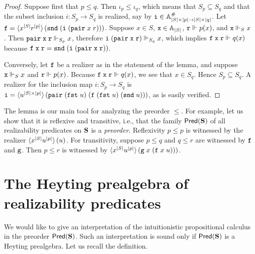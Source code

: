 \begin{proof}
  Suppose first that $p \leq q$. Then $\iota_p \leq \iota_q$, which
  means that $S_p \subseteq S_q$ and that the subset inclusion $i :
  S_p \to S_q$ is realized, say by $\mathtt{i} \in \mathbb{A}^{\#}_{|S| \times |p|
    \to |S| \times |q|}$. Let $\mathtt{f} = \langle x^{|S|}
    r^{|p|} \rangle\,(\mathtt{snd}\;(\mathtt{i}\;(\mathtt{pair}\;x\;r)))$. Suppose $x
  \in S$, $\mathtt{x} \in \mathbb{A}_{|S|}$, $\mathtt{r} \Vdash p(x)$, and $\mathtt{x} \Vdash_S
  x$. Then $\mathtt{pair}\;\mathtt{x}\;\mathtt{r} \Vdash_{S_p} x$, therefore
  $\mathtt{i}\;(\mathtt{pair}\;\mathtt{x}\;\mathtt{r}) \Vdash_{S_q} x$, which implies
  $\mathtt{f}\;\mathtt{x}\;\mathtt{r} \Vdash q(x)$ because $\mathtt{f}\;\mathtt{x}\;\mathtt{r} =
  \mathtt{snd}\;(\mathtt{i}\;(\mathtt{pair}\;\mathtt{x}\;\mathtt{r}))$.

  Conversely, let $\mathtt{f}$ be a realizer as in the statement of the
  lemma, and suppose $\mathtt{x} \Vdash_S x$ and $\mathtt{r} \Vdash p(x)$. Because
  $\mathtt{f}\;\mathtt{x}\;\mathtt{r} \Vdash q(x)$, we see that $x \in S_q$. Hence $S_p
  \subseteq S_q$. A realizer for the inclusion map $i : S_p \to S_q$
  is $\mathtt{i} = \langle u^{|S| \times
      |p|} \rangle\,(\mathtt{pair}\;(\mathtt{fst}\;u)\;(\mathtt{f}\;(\mathtt{fst}\;u)\;(\mathtt{snd}\;u)))$,
  as is easily verified.
\end{proof}

The lemma is our main tool for analyzing the preorder $\leq$. For
example, let us show that it is reflexive and transitive, i.e., that
the family $\mathsf{Pred}(\mathbf{S})$ of all realizability predicates on
$\mathbf{S}$ is a \emph{preorder}. Reflexivity $p \leq p$ is witnessed by
the realizer $\langle x^{|S|} u^{|p|} \rangle\,(u)$. For
transitivity, suppose $p \leq q$ and $q \leq r$ are witnessed by
$\mathtt{f}$ and $\mathtt{g}$. Then $p \leq r$ is witnessed by
$\langle x^{|S|} u^{|p|} \rangle\,(\mathtt{g}\;x\;(\mathtt{f}\;x\;u)))$.


\section{The Heyting prealgebra of realizability predicates}
\label{sec:heyting-prealgebra}

We would like to give an interpretation of the intuitionistic
propositional calculus in the preorder $\mathsf{Pred}(\mathbf{S})$. Such an
interpretation is sound only if $\mathsf{Pred}(\mathbf{S})$ is a Heyting
prealgebra. Let us recall the definition.

